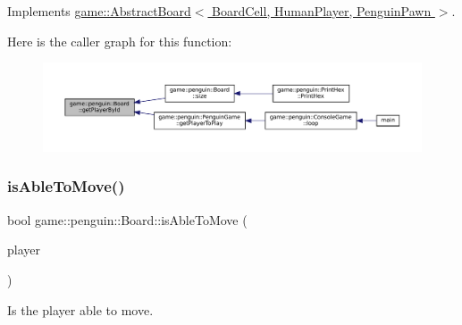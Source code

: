 Implements \hyperlink{classgame_1_1_abstract_board_a2ae30faf6d02d6d9757020a7ed7932cc}{game\+::\+Abstract\+Board$<$ Board\+Cell, Human\+Player, Penguin\+Pawn $>$}.

Here is the caller graph for this function\+:
\nopagebreak
\begin{figure}[H]
\begin{center}
\leavevmode
\includegraphics[width=350pt]{classgame_1_1penguin_1_1_board_a8728b4381bc2e007710d275bb226cf95_icgraph}
\end{center}
\end{figure}
\mbox{\label{classgame_1_1penguin_1_1_board_ae85ef3019829098c5ad5afb1c3ebceb5}} 
\subsubsection{\texorpdfstring{is\+Able\+To\+Move()}{isAbleToMove()}}
{\footnotesize\ttfamily bool game\+::penguin\+::\+Board\+::is\+Able\+To\+Move (\begin{DoxyParamCaption}\item[{const \hyperlink{classgame_1_1penguin_1_1_human_player}{Human\+Player} $\ast$const \&}]{player }\end{DoxyParamCaption})}



Is the player able to move. 


